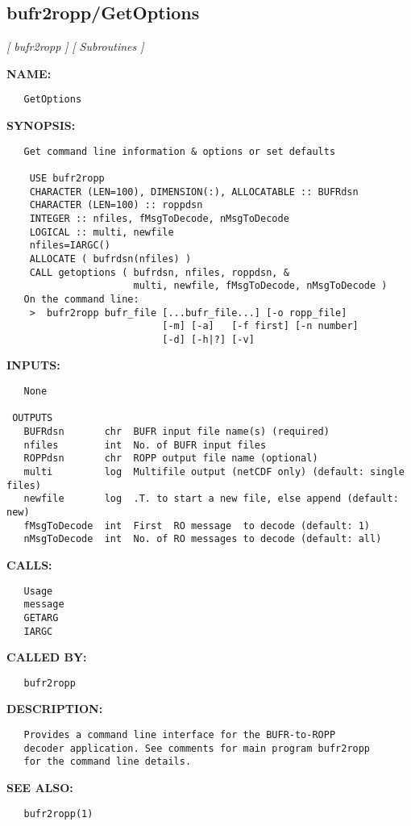 \subsection{bufr2ropp/GetOptions}
\textsl{[ bufr2ropp ]}
\textsl{[ Subroutines ]}

\label{ch:robo16}
\label{ch:bufr2ropp_GetOptions}
\textbf{NAME:}\hspace{0.08in}\begin{Verbatim}
   GetOptions
\end{Verbatim}
\textbf{SYNOPSIS:}\hspace{0.08in}\begin{Verbatim}
   Get command line information & options or set defaults

    USE bufr2ropp
    CHARACTER (LEN=100), DIMENSION(:), ALLOCATABLE :: BUFRdsn
    CHARACTER (LEN=100) :: roppdsn
    INTEGER :: nfiles, fMsgToDecode, nMsgToDecode
    LOGICAL :: multi, newfile
    nfiles=IARGC()
    ALLOCATE ( bufrdsn(nfiles) )
    CALL getoptions ( bufrdsn, nfiles, roppdsn, &
                      multi, newfile, fMsgToDecode, nMsgToDecode )
   On the command line:
    >  bufr2ropp bufr_file [...bufr_file...] [-o ropp_file]
                           [-m] [-a]   [-f first] [-n number]
                           [-d] [-h|?] [-v]
\end{Verbatim}
\textbf{INPUTS:}\hspace{0.08in}\begin{Verbatim}
   None

 OUTPUTS
   BUFRdsn       chr  BUFR input file name(s) (required)
   nfiles        int  No. of BUFR input files
   ROPPdsn       chr  ROPP output file name (optional)
   multi         log  Multifile output (netCDF only) (default: single files)
   newfile       log  .T. to start a new file, else append (default: new)
   fMsgToDecode  int  First  RO message  to decode (default: 1)
   nMsgToDecode  int  No. of RO messages to decode (default: all)
\end{Verbatim}
\textbf{CALLS:}\hspace{0.08in}\begin{Verbatim}
   Usage
   message
   GETARG
   IARGC
\end{Verbatim}
\textbf{CALLED BY:}\hspace{0.08in}\begin{Verbatim}
   bufr2ropp
\end{Verbatim}
\textbf{DESCRIPTION:}\hspace{0.08in}\begin{Verbatim}
   Provides a command line interface for the BUFR-to-ROPP
   decoder application. See comments for main program bufr2ropp
   for the command line details.
\end{Verbatim}
\textbf{SEE ALSO:}\hspace{0.08in}\begin{Verbatim}
   bufr2ropp(1)
\end{Verbatim}
